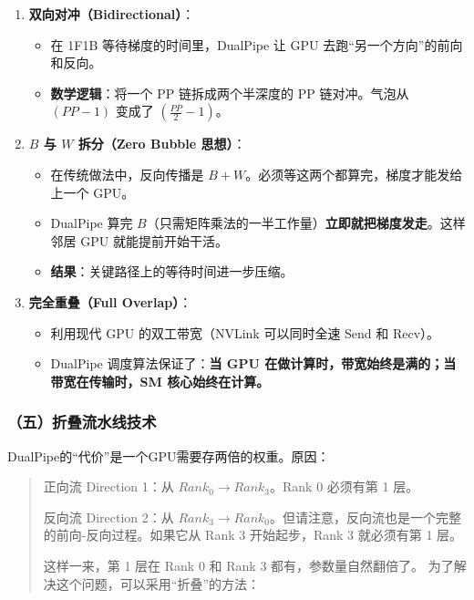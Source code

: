 \begin{enumerate}
\def\labelenumi{\arabic{enumi}.}
\tightlist
\item
  \textbf{双向对冲（Bidirectional）}：

  \begin{itemize}
  \tightlist
  \item
    在 1F1B 等待梯度的时间里，DualPipe 让 GPU 去跑``另一个方向''的前向和反向。
  \item
    \textbf{数学逻辑}：将一个 PP 链拆成两个半深度的 PP 链对冲。气泡从 \((PP - 1)\) 变成了 \(\left(\frac{PP}{2} - 1\right)\)。
  \end{itemize}
\item
  \textbf{\(B\) 与 \(W\) 拆分（Zero Bubble 思想）}：

  \begin{itemize}
  \tightlist
  \item
    在传统做法中，反向传播是 \(B + W\)。必须等这两个都算完，梯度才能发给上一个 GPU。
  \item
    DualPipe 算完 \(B\)（只需矩阵乘法的一半工作量）\textbf{立即就把梯度发走}。这样邻居 GPU 就能提前开始干活。
  \item
    \textbf{结果}：关键路径上的等待时间进一步压缩。
  \end{itemize}
\item
  \textbf{完全重叠（Full Overlap）}：

  \begin{itemize}
  \tightlist
  \item
    利用现代 GPU 的双工带宽（NVLink 可以同时全速 Send 和 Recv）。
  \item
    DualPipe 调度算法保证了：\textbf{当 GPU 在做计算时，带宽始终是满的；当带宽在传输时，SM 核心始终在计算。}
  \end{itemize}
\end{enumerate}

\hypertarget{ux4e94ux6298ux53e0ux6d41ux6c34ux7ebfux6280ux672f}{%
\subsubsection{（五）折叠流水线技术}\label{ux4e94ux6298ux53e0ux6d41ux6c34ux7ebfux6280ux672f}}

DualPipe的``代价''是一个GPU需要存两倍的权重。原因：

\begin{quote}
正向流 Direction 1：从 \(Rank_0 \rightarrow Rank_3\)。Rank 0 必须有第 1 层。

反向流 Direction 2：从 \(Rank_3 \rightarrow Rank_0\)。但请注意，反向流也是一个完整的前向-反向过程。如果它从 Rank 3 开始起步，Rank 3 就必须有第 1 层。

这样一来，第 1 层在 Rank 0 和 Rank 3 都有，参数量自然翻倍了。
为了解决这个问题，可以采用``折叠''的方法：
\end{quote}

